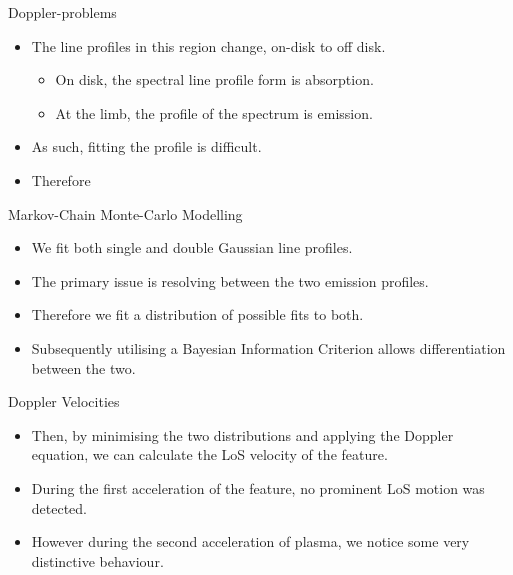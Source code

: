\documentclass{beamer}
\begin{document}

	\begin{frame}{Doppler-problems}
		\begin{itemize}
			\item{The line profiles in this region change, on-disk to off disk.}
			\begin{itemize}
				\item{On disk, the spectral line profile form is absorption.}
				\item{At the limb, the profile of the spectrum is emission.}
			\end{itemize}
			\item{As such, fitting the profile is difficult.}
			\item{Therefore}
		\end{itemize}
	\end{frame}
	
	
	
	\begin{frame}{Markov-Chain Monte-Carlo Modelling}
		\begin{itemize}
			\item{We fit both single and double Gaussian line profiles.}
			\item{The primary issue is resolving between the two emission profiles.}
			\item{Therefore we fit a distribution of possible fits to both.}
			\item{Subsequently utilising a Bayesian Information Criterion allows differentiation between the two.}
		\end{itemize}
	\end{frame}

	\begin{frame}{Doppler Velocities}
		\begin{itemize}
			\item{Then, by minimising the two distributions and applying the Doppler equation, we can calculate the LoS velocity of the feature.}
			\item{During the first acceleration of the feature, no prominent LoS motion was detected.}
			\item{However during the second acceleration of plasma, we notice some very distinctive behaviour.}
		\end{itemize}
	\end{frame}
\end{document}
